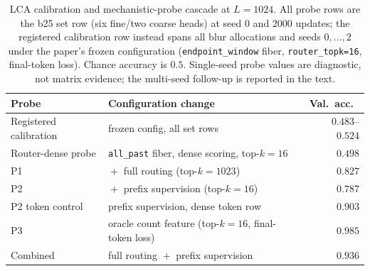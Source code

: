 \begin{table}[t]
\centering
\caption{LCA calibration and mechanistic-probe cascade at $L=1024$.  All probe
rows are the b25 set row (six fine/two coarse heads) at seed 0 and 2000
updates; the registered calibration row instead spans all blur allocations and
seeds $0,\ldots,2$ under the paper's frozen configuration
(\texttt{endpoint\_window} fiber, \texttt{router\_topk=16}, final-token loss).
Chance accuracy is $0.5$.  Single-seed probe values are diagnostic, not
matrix evidence; the multi-seed follow-up is reported in the text.}
\label{tab:lca-calibration-probes}
\begin{tabular}{llr}
\toprule
Probe & Configuration change & Val.\ acc.\ \\
\midrule
Registered calibration & frozen config, all set rows & $0.483$--$0.524$ \\
Router-dense probe & \texttt{all\_past} fiber, dense scoring, top-$k{=}16$ & $0.498$ \\
P1 & ${}+{}$ full routing (top-$k{=}1023$) & $0.827$ \\
P2 & ${}+{}$ prefix supervision (top-$k{=}16$) & $0.787$ \\
P2 token control & prefix supervision, dense token row & $0.903$ \\
P3 & oracle count feature (top-$k{=}16$, final-token loss) & $0.985$ \\
Combined & full routing ${}+{}$ prefix supervision & $0.936$ \\
\bottomrule
\end{tabular}
\end{table}
